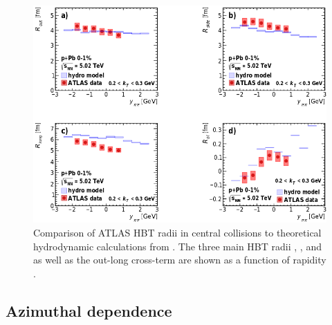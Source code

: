 \begin{figure}[t]
\centering
\includegraphics[width=\linewidth]{theory_bozek_kys.png}
\caption{Comparison of ATLAS HBT radii in central \pPb collisions to theoretical hydrodynamic calculations from . The three main HBT radii \Rout, \Rside, and \Rlong as well as the out-long cross-term \Rol are shown as a function of rapidity \kys.}
\label{fig:results_theory_kys}
\end{figure}


\subsection{Azimuthal dependence}

